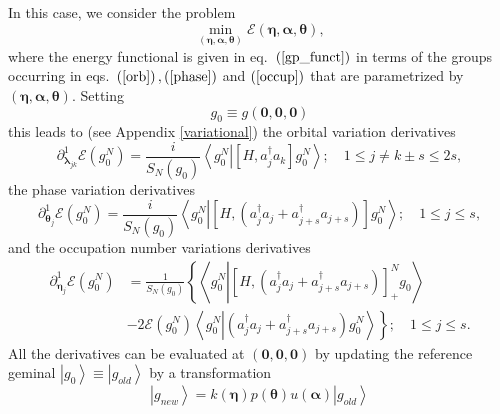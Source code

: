 \documentclass[aps,preprint]{revtex4}%
\begin{document}
In this case, we consider the problem
\begin{equation}
\min_{\left(  \bm{\eta,\alpha,\theta}\right)  }\mathcal{E}\left(
\bm{\eta,\alpha,\theta}\right)  ,
\end{equation}
where the energy functional is given in eq.\ $\left(  \ref{gp_funct}\right)  $
in terms of the groups occurring in eqs.\ $\left(  \ref{orb}\right)  ,\left(
\ref{phase}\right)  $ and $\left(  \ref{occup}\right)  $ that are parametrized
by $\left(  \bm{\eta,\alpha,\theta}\right)  $. Setting
\begin{equation}
g_{0}\equiv g\left(  \bm{0,0,0}\right)
\end{equation}
this leads to (see Appendix \ref{variational}) the orbital variation
derivatives
\begin{equation}
\partial_{\bm{\lambda}_{jk}}^{1}\mathcal{E}\left(  g_{0}^{N}\right)  =\frac
{i}{S_{N}\left(  g_{0}\right)  }\left\langle g_{0}^{N}\left\vert \left[
H,a_{j}^{\dagger}a_{k}\right]  g_{0}^{N}\right.  \right\rangle ;\quad1\leq
j\neq k\pm s\leq2s,
\end{equation}
the phase variation derivatives
\begin{equation}
\partial_{\bm{\theta}_{j}}^{1}\mathcal{E}\left(  g_{0}^{N}\right)  =\frac
{i}{S_{N}\left(  g_{0}\right)  }\left\langle g_{0}^{N}\left\vert \left[
H,\left(  a_{j}^{\dagger}a_{j}+a_{j+s}^{\dagger}a_{j+s}\right)  \right]
g_{0}^{N}\right.  \right\rangle ;\quad1\leq j\leq s,
\end{equation}
and the occupation number variations derivatives
\begin{align}
\partial_{\bm{\eta}_{j}}^{1}\mathcal{E}\left(  g_{0}^{N}\right)   &  =\frac
{1}{S_{N}\left(  g_{0}\right)  }\left\{  \left\langle g_{0}^{N}\left\vert
\left[  H,\left(  a_{j}^{\dagger}a_{j}+a_{j+s}^{\dagger}a_{j+s}\right)
\right]  _{+}^{N}g_{0}\right.  \right\rangle \right. \nonumber\\
&  -\left.  2\mathcal{E}\left(  g_{0}^{N}\right)  \left\langle g_{0}%
^{N}\left\vert \left(  a_{j}^{\dagger}a_{j}+a_{j+s}^{\dagger}a_{j+s}\right)
g_{0}^{N}\right.  \right\rangle \right\}  ;\quad1\leq j\leq s.
\end{align}
All the derivatives can be evaluated at $\left(  \bm{0},\bm{0},\bm{0}\right)
$ by updating the reference geminal $\left\vert g_{0}\right\rangle
\equiv\left\vert g_{old}\right\rangle $ by a transformation
\begin{equation}
\left\vert g_{new}\right\rangle =k\left(  \bm{\eta}\right)  p\left(
\bm{\theta}\right)  u\left(  \bm{\alpha}\right)  \left\vert g_{old}%
\right\rangle
\end{equation}
\end{document}
